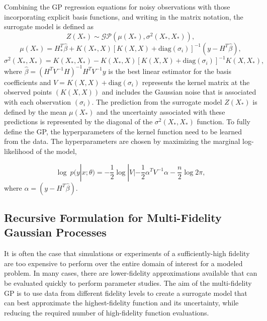 Combining the GP regression equations for noisy observations with those incorporating explicit basis functions, and writing in the matrix notation, the surrogate model is defined as 
\begin{equation}
    Z(X_*) \sim \mathcal{GP} (\mu(X_*), \sigma^2(X_*,X_*)),
\end{equation}
\begin{equation} \label{equ:mu_gpr}
    \mu(X_*) = H_*^T\hat{\beta} + K(X_*,X)[K(X,X)+\text{diag}(\sigma_i)]^{-1} (y-H^T\hat{\beta}), 
\end{equation}
\begin{equation} \label{equ:sig_gpr}
    \sigma^2(X_*,X_*) = K(X_*,X_*) - K(X_*,X)[K(X,X)+\text{diag}(\sigma_i)]^{-1} K(X,X_*), 
\end{equation}
where $\hat{\beta} = (H^TV^{-1}H)^{-1}H^TV^{-1}y$ is the best linear estimator for the basis coefficients and $V = K(X,X) + \text{diag}(\sigma_i)$ represents the kernel matrix at the observed points $\left ( K(X,X) \right )$ and includes the Gaussian noise that is associated with each observation $\left ( \sigma_i \right )$. The prediction from the surrogate model $Z(X_*)$ is defined by the mean $\mu(X_*)$ and the uncertainty associated with these predictions is represented by the diagonal of the $\sigma^2(X_*,X_*)$ function. To fully define the GP, the hyperparameters of the kernel function need to be learned from the data. The hyperparameters are chosen by maximizing the marginal log-likelihood of the model, 

\begin{equation}
    \log~p(y|x;\theta) = -\frac{1}{2} \log|V| - \frac{1}{2}\alpha^T V^{-1}\alpha - \frac{n}{2}\log 2\pi,
\end{equation}
where $\alpha = \left ( y-H^T\hat{\beta} \right )$.

\subsection{Recursive Formulation for Multi-Fidelity Gaussian Processes}\label{sec:MF_GP}
It is often the case that simulations or experiments of a sufficiently-high fidelity are too expensive to perform over the entire domain of interest for a modeled problem. In many cases, there are lower-fidelity approximations available that can be evaluated quickly to perform parameter studies. The aim of the multi-fidelity GP is to use data from different fidelity levels to create a surrogate model that can best approximate the highest-fidelity function and its uncertainty, while reducing the required number of high-fidelity function evaluations. 

